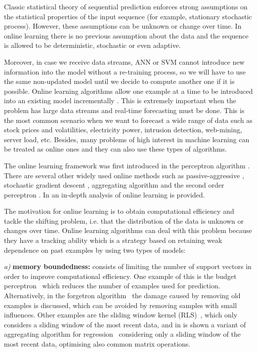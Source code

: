 Classic statistical theory of sequential prediction enforces strong assumptions
on the statistical properties of the input sequence (for example, stationary
stochastic process). However, these assumptions can be unknown or change over
time. In online learning there is no previous assumption about the data and the
sequence is allowed to be deterministic, stochastic or even adaptive.  

Moreover, in case we receive data streams, ANN or SVM cannot introduce new
information into the model without a re-training process, so we will have to use
the same non-updated model until we decide to compute another one if it is
possible.  Online learning algorithms allow one example at a time to be
introduced into an existing model incrementally \cite{vovk2005}. This is
extremely important when the problem has large data streams and real-time
forecasting must be done.  This is the most common scenario when we want to
forecast a wide range of data such as stock prices and volatilities, electricity
power, intrusion detection, web-mining, server load, etc.  Besides, many
problems of high interest in machine learning can be treated as online ones and
they can also use these types of algorithms.

The online learning framework was first introduced in the perceptron algorithm
\cite{rosenblatt58}. There are several other widely used online methods such as
passive-aggressive \cite{crammerETall2006}, stochastic gradient descent
\cite{zhang2004}, aggregating algorithm \cite{vovk2001} and the second order
perceptron \cite{cesa-bianchi2005}.  In \cite{cesa-bianchi2006} an in-depth
analysis of online learning is provided.

The motivation for online learning is to obtain computational efficiency and
tackle the shifting problem, i.e. that the distribution of the data is unknown
or changes over time. Online learning algorithms can deal with this problem
because they have a tracking ability which is a strategy based on retaining weak
dependence on past examples by using two types of models: 

\textit{a)} \textbf{memory boundedness:} consists of limiting the number of
support vectors in order to improve computational efficiency. One example of
this is the budget perceptron~\cite{crammeretal2004} which reduces the number of
examples used for prediction. Alternatively, in the forgetron
algorithm~\cite{dekeletal2008} the damage caused by removing old examples is
discussed, which can be avoided by removing samples with small influences. Other
examples are the sliding window kernel (RLS)~\cite{vanvaerenberghetal2006},
which only considers a sliding window of the most recent data, and in
\cite{arce+salinas2012} is shown a variant of aggregating algorithm for
regression~\cite{vovk2001} considering only a sliding window of the most recent
data, optimising also common matrix operations.

